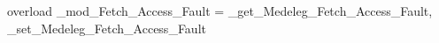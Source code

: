 overload _mod_Fetch_Access_Fault = {_get_Medeleg_Fetch_Access_Fault, _set_Medeleg_Fetch_Access_Fault}